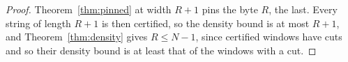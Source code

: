 \documentclass[11pt,a4paper]{article}
\theoremstyle{definition}
\theoremstyle{plain}
\begin{document}
\begin{proof}
Theorem~\ref{thm:pinned} at width \(R + 1\) pins the byte \(R\), the last. Every string of length \(R + 1\) is then
certified, so the density bound is at most \(R + 1\), and Theorem~\ref{thm:density} gives \(R \le N - 1\), since
certified windows have cuts and so their density bound is at least that of the windows with a cut.
\end{proof}

\end{document}
